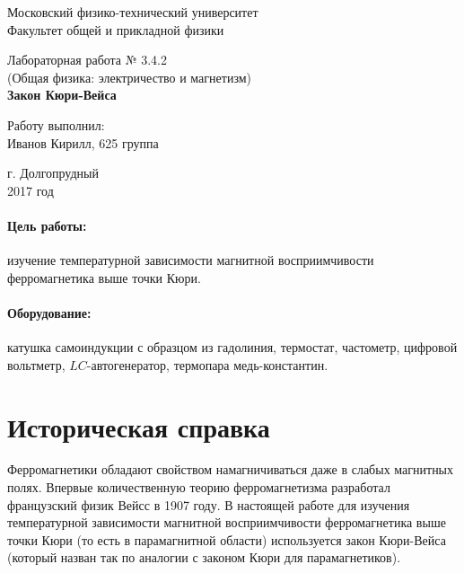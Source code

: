 \documentclass[12pt]{kiarticle} %
\begin{document}
\begin{titlepage}
	\begin{center}
		\large 	Московский физико-технический университет \\
		Факультет общей и прикладной физики \\
		\vspace{0.2cm}
		
		\vspace{4.5cm}
		Лабораторная работа № 3.4.2 \\ \vspace{0.2cm}
		\large (Общая физика: электричество и магнетизм) \\ \vspace{0.2cm}
		\LARGE \textbf{Закон Кюри-Вейса}
	\end{center}
	\vspace{2.3cm} \large
	
	\begin{center}
		Работу выполнил: \\
		Иванов Кирилл,
		625 группа
		

		
		
	\end{center}
	
	\begin{center} \vspace{50mm}
		г. Долгопрудный \\
		 2017 год
	\end{center}
\end{titlepage}

\paragraph*{Цель работы:} изучение температурной зависимости магнитной восприимчивости ферромагнетика выше точки Кюри.

\paragraph*{Оборудование:} катушка самоиндукции с образцом из гадолиния, термостат, частометр, цифровой вольтметр, $ LC $-автогенератор, термопара медь-константин.


\section{Историческая справка}

Ферромагнетики обладают свойством намагничиваться даже в слабых магнитных полях. Впервые количественную теорию ферромагнетизма разработал французский физик Вейсс в 1907 году. В настоящей работе для изучения температурной зависимости магнитной восприимчивости ферромагнетика выше точки Кюри (то есть в парамагнитной области) используется закон Кюри-Вейса (который назван так по аналогии с законом Кюри для парамагнетиков).
\end{document}
